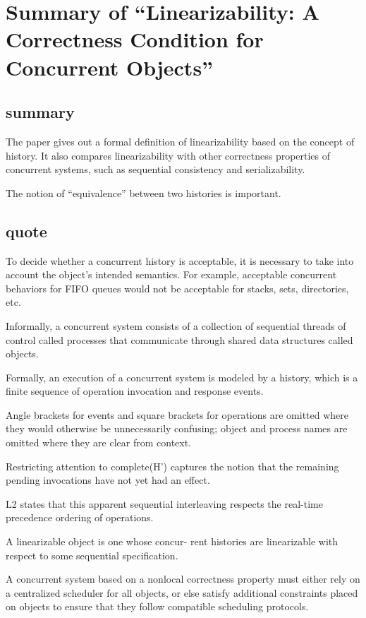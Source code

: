 \documentclass{llncs}
\begin{document}
\section{Summary of ``Linearizability: A Correctness Condition for Concurrent
Objects''\cite{Herlihy1990Linearizability}} 
  \label{section:linearizability_con_obj}
\subsection{summary}
The paper gives out a formal definition of linearizability based on the concept
of history. It also compares linearizability with other correctness properties
of concurrent systems, such as sequential consistency and serializability.

The notion of ``equivalence'' between two histories is important.


\subsection{quote}
To decide whether a concurrent history is acceptable, it is necessary to take
into account the object’s intended semantics. For example, acceptable concurrent
behaviors for FIFO queues would not be acceptable for stacks, sets, directories,
etc.

Informally, a concurrent system consists of a collection of sequential threads of
control called processes that communicate through shared data structures called
objects. 


Formally, an execution of a concurrent system is modeled by a history, which
is a finite sequence of operation invocation and response events. 

Angle brackets
for events and square brackets for operations are omitted where they would
otherwise be unnecessarily confusing; object and process names are omitted
where they are clear from context.

Restricting
attention to complete(H’) captures the notion that the remaining pending
invocations have not yet had an effect.


L2 states that this
apparent sequential interleaving respects the real-time precedence ordering of
operations.

A linearizable object is one whose concur-
rent histories are linearizable with respect to some sequential specification.

A concurrent system based on a nonlocal
correctness property must either rely on a centralized scheduler for all objects,
or else satisfy additional constraints placed on objects to ensure that they follow
compatible scheduling protocols. 
\end{document}
